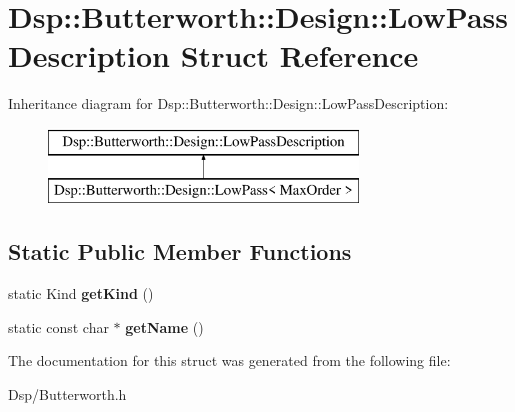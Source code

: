 \hypertarget{structDsp_1_1Butterworth_1_1Design_1_1LowPassDescription}{\section{Dsp\-:\-:Butterworth\-:\-:Design\-:\-:Low\-Pass\-Description Struct Reference}
\label{structDsp_1_1Butterworth_1_1Design_1_1LowPassDescription}
}
Inheritance diagram for Dsp\-:\-:Butterworth\-:\-:Design\-:\-:Low\-Pass\-Description\-:\begin{figure}[H]
\begin{center}
\leavevmode
\includegraphics[height=2.000000cm]{structDsp_1_1Butterworth_1_1Design_1_1LowPassDescription}
\end{center}
\end{figure}
\subsection*{Static Public Member Functions}
\begin{DoxyCompactItemize}
\item 
\hypertarget{structDsp_1_1Butterworth_1_1Design_1_1LowPassDescription_ac4538d2e9d7bd256c2a9bf3a11ea9eeb}{static Kind {\bfseries get\-Kind} ()}\label{structDsp_1_1Butterworth_1_1Design_1_1LowPassDescription_ac4538d2e9d7bd256c2a9bf3a11ea9eeb}

\item 
\hypertarget{structDsp_1_1Butterworth_1_1Design_1_1LowPassDescription_a910382c14105a2d3240a163e87b39656}{static const char $\ast$ {\bfseries get\-Name} ()}\label{structDsp_1_1Butterworth_1_1Design_1_1LowPassDescription_a910382c14105a2d3240a163e87b39656}

\end{DoxyCompactItemize}


The documentation for this struct was generated from the following file\-:\begin{DoxyCompactItemize}
\item 
Dsp/Butterworth.\-h\end{DoxyCompactItemize}
